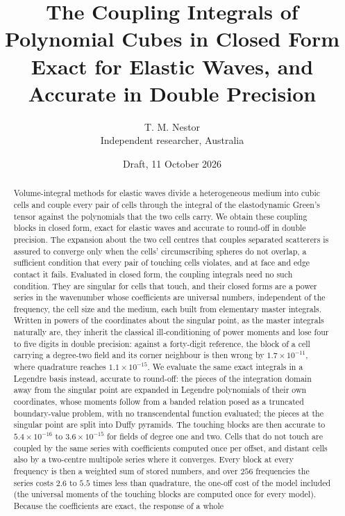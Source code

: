 \documentclass[11pt,a4paper]{article}
\title{\bfseries The Coupling Integrals of Polynomial Cubes in Closed Form\\[4pt]
\large Exact for Elastic Waves, and Accurate in Double Precision}
\author{T. M. Nestor\\[2pt]\small Independent researcher, Australia}
\date{Draft, 11 October 2026}
\begin{document}
\maketitle

\begin{abstract}
\noindent
Volume-integral methods for elastic waves divide a heterogeneous medium into cubic cells and couple every
pair of cells through the integral of the elastodynamic Green's tensor against the polynomials that the two
cells carry. We obtain these coupling blocks in closed form, exact for elastic waves and accurate to
round-off in double precision. The expansion about the two cell centres that couples separated scatterers is
assured to converge only when the cells' circumscribing spheres do not overlap, a sufficient condition that
every pair of touching cells violates, and at face and edge contact it fails. Evaluated in closed form, the
coupling integrals need no such condition. They are singular for cells that touch, and their closed
forms are a power series in the wavenumber whose coefficients are universal numbers, independent of the
frequency, the cell size and the medium, each built from elementary master integrals. Written in powers
of the coordinates about the singular point, as the master integrals naturally are, they inherit the
classical ill-conditioning of power moments and lose four to five digits in double precision: against a
forty-digit reference, the block of a cell carrying a degree-two field and its corner neighbour is then
wrong by $1.7\times10^{-11}$, where quadrature reaches $1.1\times10^{-15}$. We evaluate the same exact
integrals in a Legendre basis instead, accurate to round-off: the pieces of the
integration domain away from the singular point are expanded in Legendre polynomials of their own
coordinates, whose moments follow from a banded relation posed as a truncated boundary-value problem, with
no transcendental function evaluated; the pieces at the singular point are split into Duffy pyramids. The
touching blocks are then accurate to $5.4\times10^{-16}$ to $3.6\times10^{-15}$ for fields of degree one and
two. Cells that do not touch are coupled by the same series with coefficients computed once per offset, and
distant cells also by a two-centre multipole series where it converges. Every block at every frequency is
then a weighted sum of stored numbers, and over $256$ frequencies the series costs $2.6$ to $5.5$ times less
than quadrature, the one-off cost of the model included (the universal moments of the touching blocks are
computed once for every model). Because the coefficients are exact, the response of a whole

\end{abstract}
\end{document}
